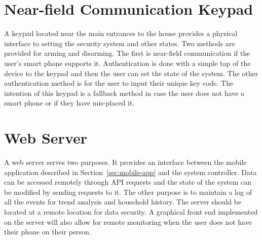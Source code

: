 \documentclass{report}
\begin{document}
\section{Near-field Communication Keypad}
A keypad located near the main entrances to the house provides a physical
interface to setting the security system and other states. Two methods are
provided for arming and disarming. The first is near-field communication if the
user's smart phone supports it. Authentication is done with a simple tap of the
device to the keypad and then the user can set the state of the system. The
other authentication method is for the user to input their unique key code. The
intention of this keypad is a fallback method in case the user does not have a
smart phone or if they have mis-placed it.

\section{Web Server}
\label{sec:web-server}
A web server serves two purposes. It provides an interface between the mobile
application described in Section~\ref{sec:mobile-app} and the system
controller. Data can be accessed remotely through API requests and the state of
the system can be modified by sending requests to it. The other purpose is to
maintain a log of all the events for trend analysis and household history. The
server should be located at a remote location for data security.  A graphical
front end implemented on the server will also allow for remote monitoring when
the user does not have their phone on their person. 
\end{document}
